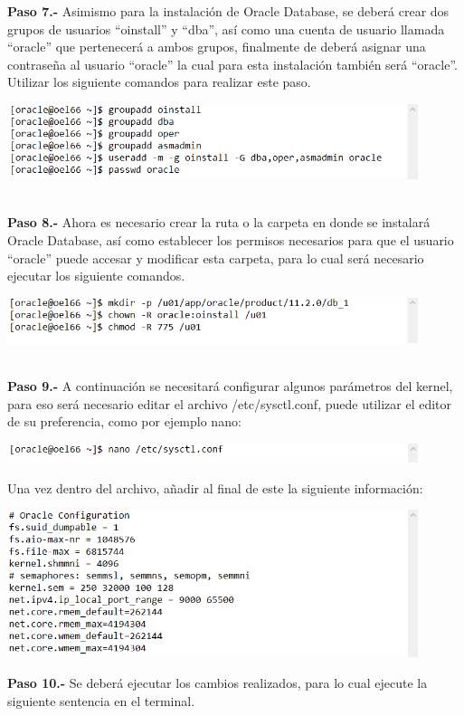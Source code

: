 \begin{enumerate}
\textbf {Paso 7.-} Asimismo para la instalación de Oracle Database, se deberá crear dos grupos de usuarios “oinstall” y “dba”, así como una cuenta de usuario llamada “oracle” que pertenecerá a ambos grupos, finalmente de deberá asignar una contraseña al usuario “oracle” la cual para esta instalación también será “oracle”. Utilizar los siguiente comandos para realizar este paso.

\begin{center}
  \includegraphics[width=12cm]{Imagenes/Oracle_Database/Paso_7.png}
\end{center}
\vspace{12pt}\\

\textbf {Paso 8.-} Ahora es necesario crear la ruta o la carpeta en donde se instalará Oracle Database, así como establecer los permisos necesarios para que el usuario “oracle” puede accesar y modificar esta carpeta, para lo cual será necesario ejecutar los siguiente comandos.

\begin{center}
  \includegraphics[width=12cm]{Imagenes/Oracle_Database/Paso_8.png}
\end{center}
\vspace{12pt}\\

\textbf {Paso 9.-} A continuación se necesitará configurar algunos parámetros del kernel, para eso será necesario editar el archivo /etc/sysctl.conf, puede utilizar el editor de su preferencia, como por ejemplo nano:

\begin{center}
  \includegraphics[width=12cm]{Imagenes/Oracle_Database/Paso_9.png}
\end{center}
\break
Una vez dentro del archivo, añadir al final de este la siguiente información:
\begin{center}
  \includegraphics[width=12cm]{Imagenes/Oracle_Database/Paso_9_2.png}
\end{center}
\textbf {Paso 10.-} Se deberá ejecutar los cambios realizados, para lo cual ejecute la siguiente sentencia en el terminal.


\end{enumerate}
